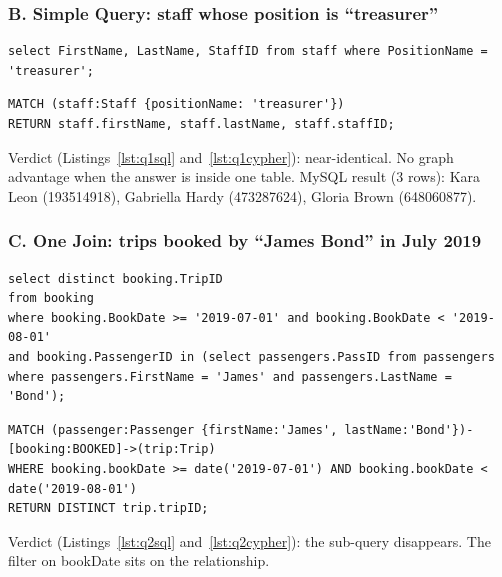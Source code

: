 \documentclass[11pt,a4paper]{article}
\begin{document}
\subsubsection*{B. Simple Query: staff whose position is ``treasurer''}

\begin{lstlisting}[style=sqlcode,caption={Selecting staff by position in SQL},label={lst:q1sql}]
select FirstName, LastName, StaffID from staff where PositionName = 'treasurer';
\end{lstlisting}

\begin{lstlisting}[style=cyphercode,caption={Selecting staff by position in Cypher},label={lst:q1cypher}]
MATCH (staff:Staff {positionName: 'treasurer'})
RETURN staff.firstName, staff.lastName, staff.staffID;
\end{lstlisting}

Verdict (Listings~\ref{lst:q1sql} and~\ref{lst:q1cypher}): near-identical. No graph advantage when the answer is inside one table. MySQL result (3 rows): Kara Leon (193514918), Gabriella Hardy (473287624), Gloria Brown (648060877).

\subsubsection*{C. One Join: trips booked by ``James Bond'' in July 2019}

\begin{lstlisting}[style=sqlcode,caption={Trips booked by one passenger in July 2019, in SQL},label={lst:q2sql}]
select distinct booking.TripID
from booking
where booking.BookDate >= '2019-07-01' and booking.BookDate < '2019-08-01'
and booking.PassengerID in (select passengers.PassID from passengers
where passengers.FirstName = 'James' and passengers.LastName = 'Bond');
\end{lstlisting}

\begin{lstlisting}[style=cyphercode,caption={The same query in Cypher, filtering in a separate WHERE clause},label={lst:q2cypher}]
MATCH (passenger:Passenger {firstName:'James', lastName:'Bond'})-[booking:BOOKED]->(trip:Trip)
WHERE booking.bookDate >= date('2019-07-01') AND booking.bookDate < date('2019-08-01')
RETURN DISTINCT trip.tripID;
\end{lstlisting}

Verdict (Listings~\ref{lst:q2sql} and~\ref{lst:q2cypher}): the sub-query disappears. The filter on bookDate sits on the relationship.
\end{document}
